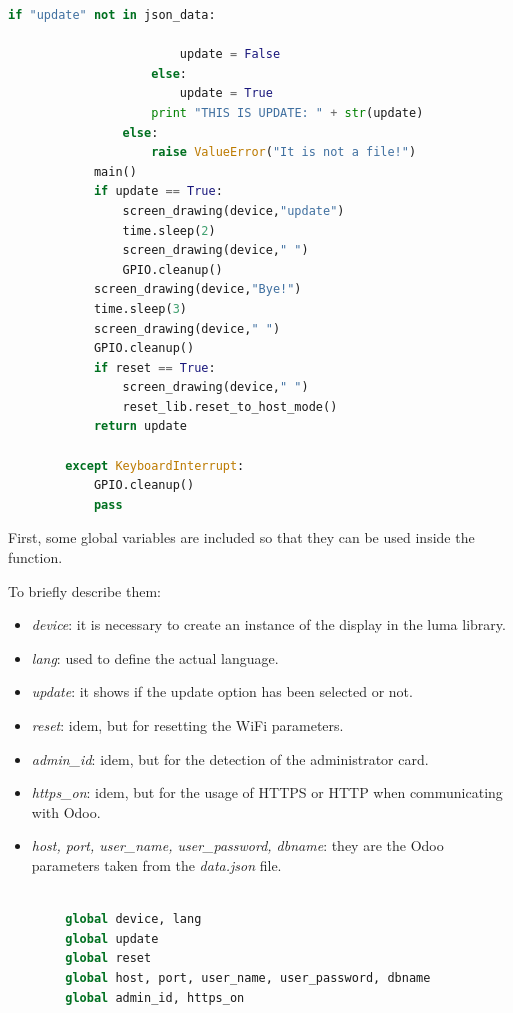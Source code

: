 \documentclass[12pt,a4paper,oneside]{article} %
\begin{document}
\begin{lstlisting}[language=python]
	                if "update" not in json_data:
	
	                    update = False
	                else:
	                    update = True
	                print "THIS IS UPDATE: " + str(update)
	            else:
	                raise ValueError("It is not a file!")
	        main()
	        if update == True:
	            screen_drawing(device,"update")
	            time.sleep(2)
	            screen_drawing(device," ")
	            GPIO.cleanup()
	        screen_drawing(device,"Bye!")
	        time.sleep(3)
	        screen_drawing(device," ")
	        GPIO.cleanup()
	        if reset == True:
	            screen_drawing(device," ")
	            reset_lib.reset_to_host_mode()
	        return update
	
	    except KeyboardInterrupt:
	        GPIO.cleanup()
	        pass


\end{lstlisting}

First, some global variables are included so that they can be used inside the function.

To briefly describe them: 

\begin{itemize}
	\item \emph{device}: it is necessary to create an instance of the display in the luma library.
	\item \emph{lang}: used to define the actual language.
	\item \emph{update}: it shows if the update option has been selected or not.
	\item \emph{reset}: idem, but for resetting the WiFi parameters.
	\item \emph{admin\_id}: idem, but for the detection of the administrator card.
	\item \emph{https\_on}: idem, but for the usage of HTTPS or HTTP when communicating with Odoo.
	\item \emph{host, port, user\_name, user\_password, dbname}: they are the Odoo parameters taken from the \emph{data.json} file.
\end{itemize}

\begin{lstlisting}[language=python]

	    global device, lang
	    global update
	    global reset
	    global host, port, user_name, user_password, dbname
	    global admin_id, https_on

\end{lstlisting}
\end{document}
